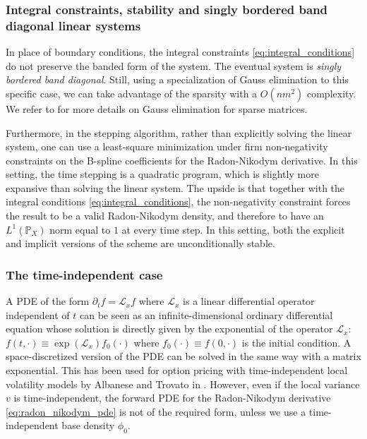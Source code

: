 \documentclass[a4paper]{article}
\newcommand{\1}{\textbf{1}}
\newcommand{\PP}{\mathbb{P}}
\begin{document}
\subsubsection*{Integral constraints, stability and singly bordered band diagonal linear systems}
\par In place of boundary conditions, the integral constraints \eqref{eq:integral_conditions} do not preserve the banded form of the system. The eventual system is \emph{singly bordered band diagonal}. Still, using a specialization of Gauss elimination to this specific case, we can take advantage of the sparsity with a $O(n m^2)$ complexity. We refer to \cite{GolubVanLoan} for more details on Gauss elimination for sparse matrices. 
\par Furthermore, in the stepping algorithm, rather than explicitly solving the linear system, one can use a least-square minimization under firm non-negativity constraints on the B-spline coefficients for the Radon-Nikodym derivative. In this setting, the time stepping is a quadratic program, which is slightly more expansive than solving the linear system. The upside is that together with the integral conditions \eqref{eq:integral_conditions}, the non-negativity constraint forces the result to be a valid Radon-Nikodym density, and therefore to have an $L^1(\PP_X)$ norm equal to $1$ at every time step. In this setting, both the explicit and implicit versions of the scheme are unconditionally stable. 
\subsubsection*{The time-independent case}
\par \noindent A PDE of the form $\partial_t f = \mathcal{L}_x f$ where $\mathcal{L}_x$ is a linear differential operator independent of $t$ can be seen as an infinite-dimensional ordinary differential equation whose solution is directly given by the exponential of the operator $\mathcal{L}_x$: $f(t, \cdot) \equiv \exp(\mathcal{L}_x) f_0(\cdot)$ where $f_0(\cdot) \equiv f(0, \cdot)$ is the initial condition. A space-discretized version of the PDE can be solved in the same way with a matrix exponential. This has been used for option pricing with time-independent local volatility models by Albanese and Trovato in \cite{AlbaneseTrovatoCMS}. However, even if the local variance $v$ is time-independent, the forward PDE for the Radon-Nikodym derivative \eqref{eq:radon_nikodym_pde} is not of the required form, unless we use a time-independent base density $\phi_0$. 
\end{document}
